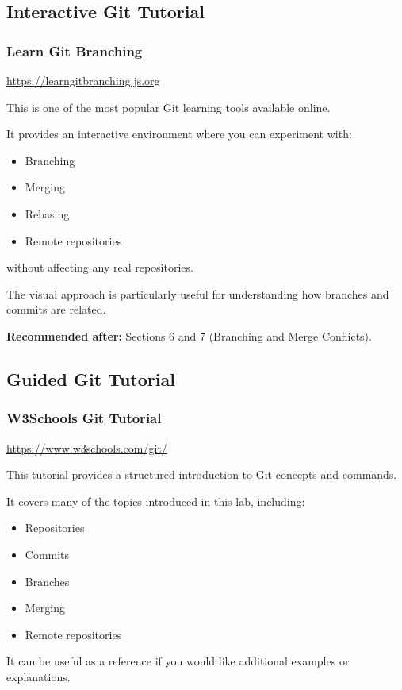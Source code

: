 \documentclass{csc2059practical}
\begin{document}
\subsection{Interactive Git Tutorial}
\subsubsection{Learn Git Branching}
\url{https://learngitbranching.js.org}

This is one of the most popular Git learning tools available online.

It provides an interactive environment where you can experiment with:

\begin{itemize}
  \item Branching
  \item Merging
  \item Rebasing
  \item Remote repositories
\end{itemize}
without affecting any real repositories.

The visual approach is particularly useful for understanding how branches and commits are related.

\textbf{Recommended after:} Sections 6 and 7 (Branching and Merge Conflicts).

\subsection{Guided Git Tutorial}
\subsubsection{W3Schools Git Tutorial}
\url{https://www.w3schools.com/git/}

This tutorial provides a structured introduction to Git concepts and commands.

It covers many of the topics introduced in this lab, including:

\begin{itemize}
  \item Repositories
  \item Commits
  \item Branches
  \item Merging
  \item Remote repositories
\end{itemize}
It can be useful as a reference if you would like additional examples or explanations.
\end{document}
